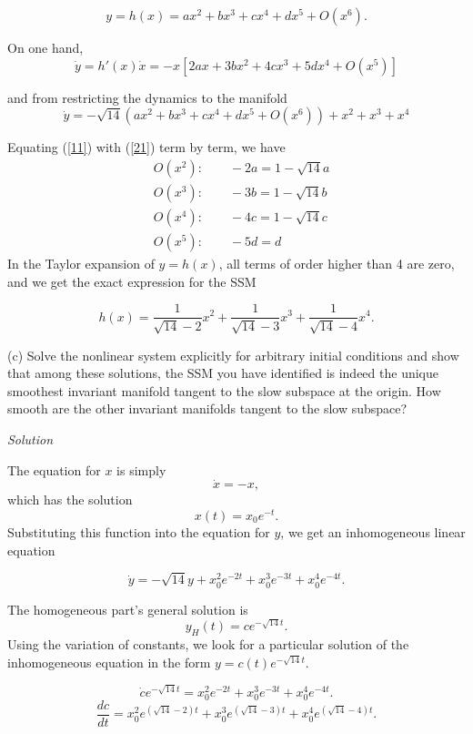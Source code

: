 \documentclass[a4paper,11pt,pdftex]{article}
\begin{document}
$$
y = h(x) = ax^2 + bx^3 + cx^4 + dx^5 + O(x^6).
$$

On one hand, 
\begin{equation}
\label{11}
   \dot{y} = h'(x)\dot{x} = -x[2ax + 3bx^2 + 4cx^3 + 5dx^4 + O(x^5)] 
\end{equation}

and from restricting the dynamics to the manifold
\begin{equation}
\label{21}
\dot{y} = -\sqrt{14}(ax^2 + bx^3 + cx^4 + dx^5 + O(x^6)) + x^2 + x^3 + x^4
\end{equation}

Equating (\ref{11}) with (\ref{21}) term by term, we have
\begin{align*}
    &O(x^2): \qquad -2a = 1-\sqrt{14}a \\
    &O(x^3): \qquad -3b = 1 - \sqrt{14}b \\
    &O(x^4): \qquad -4c = 1 -\sqrt{14}c \\
    &O(x^5): \qquad -5d = d
\end{align*}
In the Taylor expansion of $y=h(x)$, all terms of order higher than 4 are zero, and we get the exact expression for the SSM

\begin{equation}
\label{ssm}
    h(x) = \frac{1}{\sqrt{14}-2}x^2 + \frac{1}{\sqrt{14}-3}x^3 + \frac{1}{\sqrt{14}-4}x^4.
\end{equation}

(c) Solve the nonlinear system explicitly for arbitrary initial conditions and show that among these solutions, the SSM you have identified is indeed the unique smoothest invariant manifold tangent to the slow subspace at the origin. How smooth are the other invariant manifolds tangent to the slow subspace? 

\emph{Solution}

The equation for $x$ is simply
$$
\dot{x} = -x,
$$
which has the solution 
$$
x(t) = x_0e^{-t}.
$$
Substituting this function into the equation for $y$, we get an inhomogeneous linear equation

$$
\dot{y} = -\sqrt{14}y + x_0^2 e^{-2t} + x_0^3 e^{-3t} + x_0^4 e^{-4t}.
$$

The homogeneous part's general solution is 
$$
y_H(t) = ce^{-\sqrt{14}t}.
$$
Using the variation of constants, we look for a particular solution of the inhomogeneous equation in the form $y=c(t)e^{-\sqrt{14}t}$.

$$
\dot{c}e^{-\sqrt{14}t}=x_0^2 e^{-2t} + x_0^3 e^{-3t} + x_0^4 e^{-4t}.
$$
$$
\frac{dc}{dt} = x_0^2 e^{(\sqrt{14}-2)t} + x_0^3 e^{(\sqrt{14}-3)t} + x_0^4 e^{(\sqrt{14}-4)t}.
$$
\end{document}
